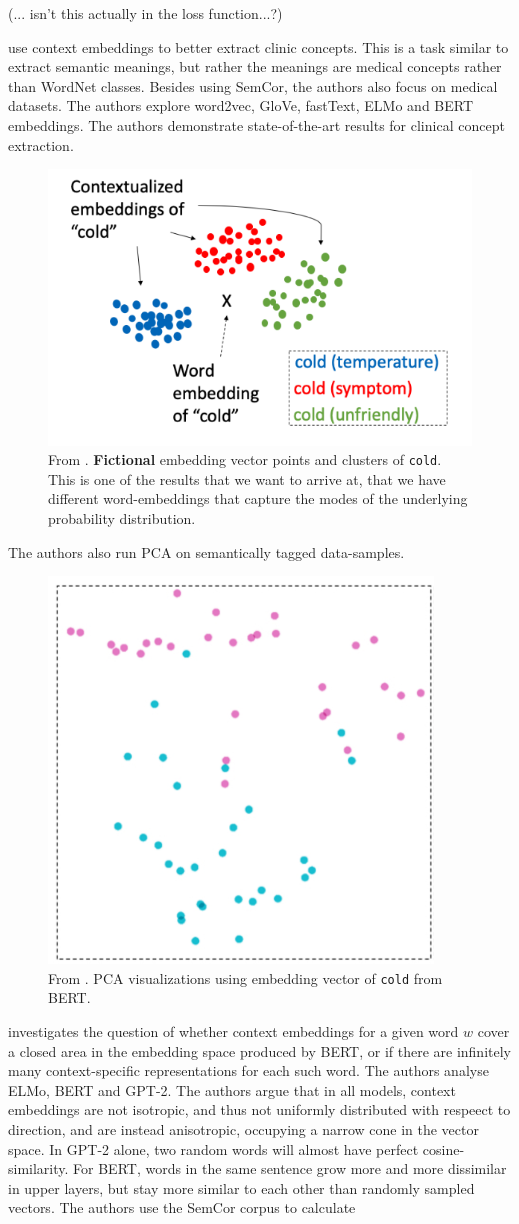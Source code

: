 \documentclass[a4paper,12pt,twoside,openright]{report}
\begin{document}
(... isn't this actually in the loss function...?)

\cite{si19} use context embeddings to better extract clinic concepts. 
This is a task similar to extract semantic meanings, but rather the meanings are medical concepts rather than WordNet classes.
Besides using SemCor, the authors also focus on medical datasets.
The authors explore word2vec, GloVe, fastText, ELMo and BERT embeddings.
The authors demonstrate state-of-the-art results for clinical concept extraction.

\begin{figure}[H]
	\center
  \includegraphics[width=0.4\linewidth]{./assets/relatedwork/cold_fictional_desired.png}
  \caption{From \cite{si19}. \textbf{Fictional} embedding vector points and clusters of \texttt{cold}. This is one of the results that we want to arrive at, that we have different word-embeddings that capture the modes of the underlying probability distribution. }
  \label{fig:cold_fictional_desired}
\end{figure}

The authors also run PCA on semantically tagged data-samples.

\begin{figure}[H]
	\center
  \includegraphics[width=0.4\linewidth]{./assets/relatedwork/cold_biobert.png}
  \caption{From \cite{si19}. PCA visualizations using embedding vector of \texttt{cold} from BERT.}
  \label{fig:cold_fictional_desired}
\end{figure}

\cite{ethayarajh19} investigates the question of whether context embeddings for a given word $w$ cover a closed area in the embedding space produced by BERT, or if there are infinitely many context-specific representations for each such word.
The authors analyse ELMo, BERT and GPT-2.
The authors argue that in all models, context embeddings are not isotropic, and thus not uniformly distributed with respeect to direction, and are instead anisotropic, occupying a narrow cone in the vector space.
In GPT-2 alone, two random words will almost have perfect cosine-similarity.
For BERT, words in the same sentence grow more and more dissimilar in upper layers, but stay more similar to each other than randomly sampled vectors.
The authors use the SemCor corpus to calculate \\
\end{document}
